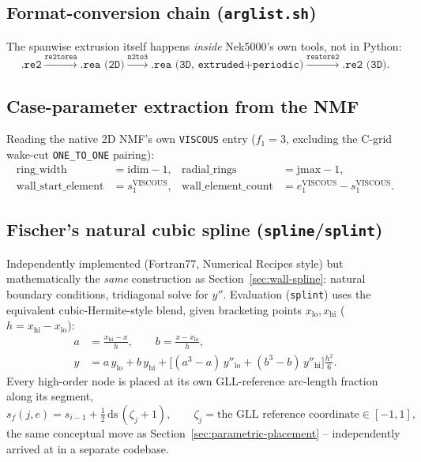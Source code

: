 \documentclass[11pt]{article}
\begin{document}
\subsection{Format-conversion chain (\texttt{arglist.sh})}
The spanwise extrusion itself happens \emph{inside} Nek5000's own
tools, not in Python:
\begin{equation}
\texttt{.re2} \xrightarrow{\texttt{re2torea}} \texttt{.rea (2D)}
\xrightarrow{\texttt{n2to3}} \texttt{.rea (3D, extruded+periodic)}
\xrightarrow{\texttt{reatore2}} \texttt{.re2 (3D)}.
\end{equation}

\subsection{Case-parameter extraction from the NMF}
Reading the native 2D NMF's own \texttt{VISCOUS} entry
(\(f_1=3\), excluding the C-grid wake-cut \texttt{ONE\_TO\_ONE} pairing):
\begin{align}
\text{ring\_width} &= \text{idim} - 1, &
\text{radial\_rings} &= \text{jmax} - 1, \\
\text{wall\_start\_element} &= s_1^{\text{VISCOUS}}, &
\text{wall\_element\_count} &= e_1^{\text{VISCOUS}} - s_1^{\text{VISCOUS}} .
\end{align}

\subsection{Fischer's natural cubic spline (\texttt{spline}/\texttt{splint})}
\label{sec:fischer-spline}
Independently implemented (Fortran77, Numerical Recipes style) but
mathematically the \emph{same} construction as Section~\ref{sec:wall-spline}:
natural boundary conditions, tridiagonal solve for \(y''\). Evaluation
(\texttt{splint}) uses the equivalent cubic-Hermite-style blend, given
bracketing points \(x_{\mathrm{lo}}, x_{\mathrm{hi}}\) (\(h = x_{\mathrm{hi}}-x_{\mathrm{lo}}\)):
\begin{align}
a &= \frac{x_{\mathrm{hi}} - x}{h}, \qquad b = \frac{x - x_{\mathrm{lo}}}{h}, \\
y &= a\,y_{\mathrm{lo}} + b\,y_{\mathrm{hi}} + \big[(a^3-a)\,y''_{\mathrm{lo}} + (b^3-b)\,y''_{\mathrm{hi}}\big]\frac{h^2}{6}.
\end{align}
Every high-order node is placed at its own GLL-reference arc-length
fraction along its segment,
\begin{equation}
s_f(j,e) = s_{i-1} + \tfrac{1}{2}\,\mathrm{ds}\,(\zeta_j + 1), \qquad \zeta_j = \text{the GLL reference coordinate} \in[-1,1],
\end{equation}
the same conceptual move as Section~\ref{sec:parametric-placement} --
independently arrived at in a separate codebase.
\end{document}
